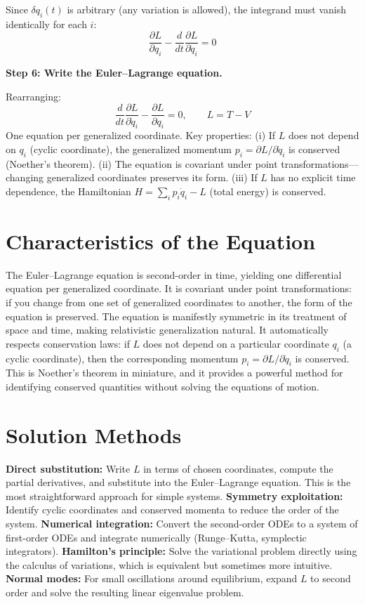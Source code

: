 Since $\delta q_i(t)$ is arbitrary (any variation is allowed), the integrand must vanish identically for each $i$:
\begin{equation}
\frac{\partial L}{\partial q_i} - \frac{d}{dt}\frac{\partial L}{\partial \dot{q}_i} = 0
\end{equation}

\textbf{Step 6: Write the Euler--Lagrange equation.}

Rearranging:
\begin{equation}
\boxed{\frac{d}{dt}\frac{\partial L}{\partial \dot{q}_i} - \frac{\partial L}{\partial q_i} = 0, \qquad L = T - V}
\end{equation}
One equation per generalized coordinate. Key properties: (i) If $L$ does not depend on $q_i$ (cyclic coordinate), the generalized momentum $p_i = \partial L/\partial\dot{q}_i$ is conserved (Noether's theorem). (ii) The equation is covariant under point transformations---changing generalized coordinates preserves its form. (iii) If $L$ has no explicit time dependence, the Hamiltonian $H = \sum_i p_i\dot{q}_i - L$ (total energy) is conserved.

\section*{Characteristics of the Equation}

The Euler--Lagrange equation is second-order in time, yielding one differential equation per generalized coordinate. It is covariant under point transformations: if you change from one set of generalized coordinates to another, the form of the equation is preserved. The equation is manifestly symmetric in its treatment of space and time, making relativistic generalization natural. It automatically respects conservation laws: if $L$ does not depend on a particular coordinate $q_i$ (a cyclic coordinate), then the corresponding momentum $p_i = \partial L / \partial \dot{q}_i$ is conserved. This is Noether's theorem in miniature, and it provides a powerful method for identifying conserved quantities without solving the equations of motion.
\section*{Solution Methods}

\textbf{Direct substitution:} Write $L$ in terms of chosen coordinates, compute the partial derivatives, and substitute into the Euler--Lagrange equation. This is the most straightforward approach for simple systems. \textbf{Symmetry exploitation:} Identify cyclic coordinates and conserved momenta to reduce the order of the system. \textbf{Numerical integration:} Convert the second-order ODEs to a system of first-order ODEs and integrate numerically (Runge--Kutta, symplectic integrators). \textbf{Hamilton's principle:} Solve the variational problem directly using the calculus of variations, which is equivalent but sometimes more intuitive. \textbf{Normal modes:} For small oscillations around equilibrium, expand $L$ to second order and solve the resulting linear eigenvalue problem.
